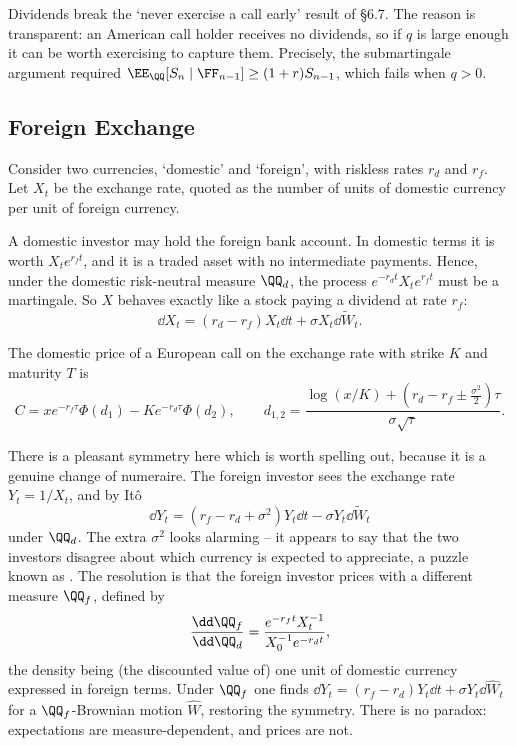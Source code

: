 Dividends break the `never exercise a call early' result of \S6.7. The reason is transparent: an American call holder receives no dividends, so if $q$ is large enough it can be worth exercising to capture them. Precisely, the submartingale argument required $\EE_\QQ[S_n\mid\FF_{n-1}]\geq (1+r)S_{n-1}$, which fails when $q > 0$.

\subsection{Foreign Exchange}

Consider two currencies, `domestic' and `foreign', with riskless rates $r_d$ and $r_f$. Let $X_t$ be the exchange rate, quoted as the number of units of domestic currency per unit of foreign currency.

A domestic investor may hold the foreign bank account. In domestic terms it is worth $X_te^{r_ft}$, and it is a traded asset with no intermediate payments. Hence, under the domestic risk-neutral measure $\QQ_d$, the process $e^{-r_dt}X_te^{r_ft}$ must be a martingale. So $X$ behaves exactly like a stock paying a dividend at rate $r_f$:
$$
\dd X_t = (r_d - r_f)X_t\dd t + \sigma X_t\dd \tilde W_t.
$$

\begin{proposition}
	The domestic price of a European call on the exchange rate with strike $K$ and maturity $T$ is
	$$
	C = xe^{-r_f\tau}\Phi(d_1) - Ke^{-r_d\tau}\Phi(d_2), \qquad d_{1,2} = \frac{\log(x/K) + (r_d - r_f \pm \tfrac{\sigma^2}{2})\tau}{\sigma\sqrt\tau}.
	$$
\end{proposition}

There is a pleasant symmetry here which is worth spelling out, because it is a genuine change of numeraire. The foreign investor sees the exchange rate $Y_t = 1/X_t$, and by It\^o
$$
\dd Y_t = (r_f - r_d + \sigma^2)Y_t\dd t - \sigma Y_t\dd\tilde W_t
$$
under $\QQ_d$. The extra $\sigma^2$ looks alarming -- it appears to say that the two investors disagree about which currency is expected to appreciate, a puzzle known as . The resolution is that the foreign investor prices with a different measure $\QQ_f$, defined by
$$
\frac{\dd\QQ_f}{\dd\QQ_d} = \frac{e^{-r_ft}X_t^{-1}}{X_0^{-1}e^{-r_dt}},
$$
the density being (the discounted value of) one unit of domestic currency expressed in foreign terms. Under $\QQ_f$ one finds $\dd Y_t = (r_f - r_d)Y_t\dd t + \sigma Y_t\dd \hat W_t$ for a $\QQ_f$-Brownian motion $\hat W$, restoring the symmetry. There is no paradox: expectations are measure-dependent, and prices are not.

